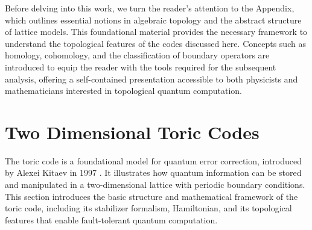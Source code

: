\documentclass[12pt]{article}
\theoremstyle{definition}
\begin{document}
Before delving into this work, we turn the reader's attention to the Appendix, which outlines essential notions in algebraic topology and the abstract structure of lattice models. This foundational material provides the necessary framework to understand the topological features of the codes discussed here. Concepts such as homology, cohomology, and the classification of boundary operators are introduced to equip the reader with the tools required for the subsequent analysis, offering a self-contained presentation accessible to both physicists and mathematicians interested in topological quantum computation.
\newpage
\section{Two Dimensional Toric Codes}
The toric code is a foundational model for quantum error correction, introduced by Alexei Kitaev in 1997 \cite{kitaev1997}. It illustrates how quantum information can be stored and manipulated in a two-dimensional lattice with periodic boundary conditions. This section introduces the basic structure and mathematical framework of the toric code, including its stabilizer formalism, Hamiltonian, and its topological features that enable fault-tolerant quantum computation.
\end{document}
